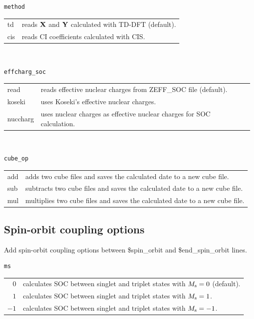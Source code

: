 ﻿\documentclass[11pt,a4paper,openany]{article}
\begin{document}
\begin{verbatim}
method
\end{verbatim}
\begin{tabular}{ll}
td & reads $\bf{X}$ and $\bf{Y}$ calculated with TD-DFT (default). \\
cis & reads CI coefficients calculated with CIS. 
\end{tabular}
\\

\begin{verbatim}
effcharg_soc
\end{verbatim}
\begin{tabular}{ll}
read & reads effective nuclear charges from ZEFF\_SOC file (default). \\
koseki & uses Koseki's effective nuclear charges.\cite{doi:10.1021/j100205a033, doi:10.1021/j100034a013, doi:10.1021/jp983453n} \\
nuccharg & uses nuclear charges as effective nuclear charges for SOC calculation.
\end{tabular}
\\

\begin{verbatim}
cube_op
\end{verbatim}
\begin{tabular}{ll}
add & adds two cube files and saves the calculated date to a new cube file.\\
sub & subtracts two cube files and saves the calculated date to a new cube file.\\
mul & multiplies two cube files and saves the calculated date to a new cube file.\\
\end{tabular}

\subsection{Spin-orbit coupling options}
\noindent
Add spin-orbit coupling options between \$spin\_orbit and \$end\_spin\_orbit lines.
\begin{verbatim}
ms
\end{verbatim}
\begin{tabular}{rl}
$0$ & calculates SOC between singlet and triplet states with $M_{\rm{s}} = 0$ (default).\\
$1$ & calculates SOC between singlet and triplet states with $M_{\rm{s}} = 1$.\\
$-1$ & calculates SOC between singlet and triplet states with $M_{\rm{s}} = -1$.
\end{tabular}
\\
\end{document}
